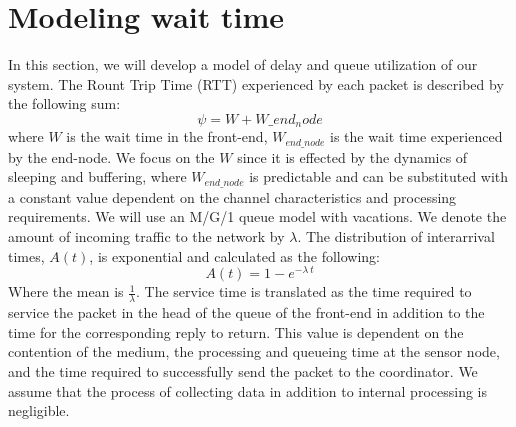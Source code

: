 \section{Modeling wait time}\label{sec:model}

In this section, we will develop a model of delay and queue utilization of our system. The Rount Trip Time (RTT) experienced by each packet is described by the following sum:
\begin{equation}
\psi = W + W\_{end_node}
\end{equation}
where $W$ is the wait time in the front-end, $W_{end\_node}$ is the wait time experienced by the end-node. We focus on the $W$ since it is effected by the dynamics of sleeping and buffering, where $W_{end\_node}$ is predictable and can be substituted with a constant value dependent on the channel characteristics and processing requirements. We will use an M/G/1 queue model with vacations. We denote the amount of incoming traffic to the network by $\lambda$. The distribution of interarrival times, $A(t)$, is exponential and calculated as the following:
\begin{equation}
A(t) = 1 - e^{-\lambda\ t}
\end{equation}
Where the mean is $\frac{1}{\lambda}$. The service time is translated as the time required to service the packet in the head of the queue of the front-end in addition to the time for the corresponding reply to return. 
This value is dependent on the contention of the medium, the processing and queueing time at the sensor node, and the time required to successfully send the packet to the coordinator. We assume that the process of collecting data in addition to internal processing is negligible.

